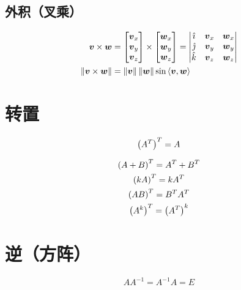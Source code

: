 \documentclass{article}
\begin{document}
\subsection{外积（叉乘）}

\[\begin{aligned}
        \boldsymbol v\times\boldsymbol w                      & =
        \begin{bmatrix}\boldsymbol v_x\\\boldsymbol v_y\\\boldsymbol v_z\end{bmatrix}\times
        \begin{bmatrix}\boldsymbol w_x\\\boldsymbol w_y\\\boldsymbol w_z\end{bmatrix}=
        \begin{vmatrix}
            \hat\imath & \boldsymbol v_x & \boldsymbol w_x \\
            \hat\jmath & \boldsymbol v_y & \boldsymbol w_y \\
            \hat k     & \boldsymbol v_z & \boldsymbol w_z
        \end{vmatrix}
        \\
        \left\Vert\boldsymbol v\times\boldsymbol w\right\Vert & =
        \left\Vert\boldsymbol v\right\Vert\left\Vert\boldsymbol w\right\Vert
        \sin\left<\boldsymbol v,\boldsymbol w\right>
    \end{aligned}\]

\section{转置}

\begin{definition}
    \[\left(A^T\right)^T=A\]
\end{definition}

\[\begin{gathered}
        \left(A+B\right)^T=A^T+B^T\\
        \left(kA\right)^T=kA^T\\
        \left(AB\right)^T=B^TA^T\\
        \left(A^k\right)^T=\left(A^T\right)^k\\
    \end{gathered}\]

\section{逆（方阵）}

\begin{definition}
    \[AA^{-1}=A^{-1}A=E\]
\end{definition}
\end{document}
